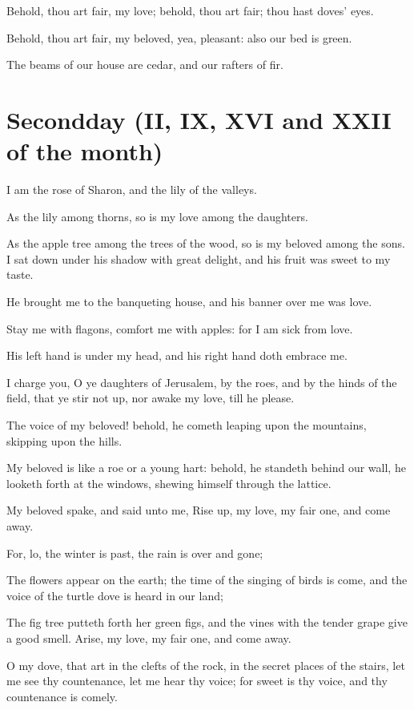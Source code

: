Behold, thou art fair, my love; behold, thou art fair; thou hast doves' eyes.

Behold, thou art fair, my beloved, yea, pleasant: also our bed is green.

The beams of our house are cedar, and our rafters of fir.

\section{Secondday (II, IX, XVI and XXII of the month)}

I am the rose of Sharon, and the lily of the valleys.

As the lily among thorns, so is my love among the daughters.

As the apple tree among the trees of the wood, so is my beloved among the sons. I sat down under his shadow with great delight, and his fruit was sweet to my taste.

He brought me to the banqueting house, and his banner over me was love.

\verseamended Stay me with flagons, comfort me with apples: for I am sick from love.

His left hand is under my head, and his right hand doth embrace me.

I charge you, O ye daughters of Jerusalem, by the roes, and by the hinds of the field, that ye stir not up, nor awake my love, till he please.

The voice of my beloved! behold, he cometh leaping upon the mountains, skipping upon the hills.

My beloved is like a roe or a young hart: behold, he standeth behind our wall, he looketh forth at the windows, shewing himself through the lattice.

My beloved spake, and said unto me, Rise up, my love, my fair one, and come away.

For, lo, the winter is past, the rain is over and gone;

\verseamended The flowers appear on the earth; the time of the singing of birds is come, and the voice of the turtle dove is heard in our land;

The fig tree putteth forth her green figs, and the vines with the tender grape give a good smell. Arise, my love, my fair one, and come away.

O my dove, that art in the clefts of the rock, in the secret places of the stairs, let me see thy countenance, let me hear thy voice; for sweet is thy voice, and thy countenance is comely.


